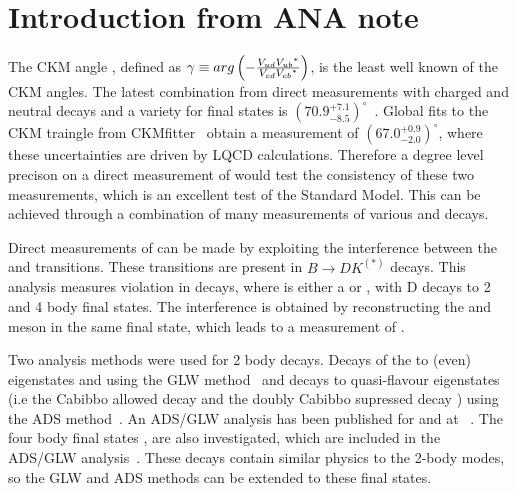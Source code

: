 \section{Introduction from ANA note}
\label{sec:Introduction}

The CKM angle \Pgamma, defined as $\gamma \equiv arg\left(-\frac{{V_{{u}{d}}}{{V_{{u}{b}}}}^*}{{V_{{c}{d}}}{{V_{{c}{b}}}}^*}\right)$, is the least well known of the CKM angles. The latest \lhcb combination from direct measurements with charged and neutral \B decays and a variety for \D final states is $\left(70.9^{+7.1}_{-8.5}\right)^{\circ}$~\cite{LHCB-PAPER-2016-032-001}. Global fits to the CKM traingle from CKMfitter~\cite{CKMfitter2015} obtain a \Pgamma measurement of $(67.0^{+0.9}_{-2.0})^{\circ}$, where these uncertainties are driven by LQCD calculations. Therefore a degree level precison on a direct measurement of \Pgamma would test the consistency of these two measurements, which is an excellent test of the Standard Model. This can be achieved through a combination of many measurements of various \B and \D decays.

Direct measurements of \Pgamma can be made by exploiting the interference between the \decay{\bquark}{\cquark\uquarkbar\squark} and \decay{\bquark}{\uquark\cquarkbar\squark} transitions. These transitions are present in $B \to DK^{(*)}$ decays. This analysis measures \CP violation in \decay{\Bpm}{\D\Kstarpm} decays, where \D is either a \Dz or \Dzb, with D decays to 2 and 4 body final states. The interference is obtained by reconstructing the \Dz and \Dzb meson in the same final state, which leads to a measurement of \Pgamma.

Two analysis methods were used for 2 body \D decays. Decays of the \D to \CP (even) eigenstates \Kp\Km and \pip\pim using the GLW method~\cite{GL,GW} and decays to quasi-flavour eigenstates \Kpm\pimp (i.e the Cabibbo allowed decay \decay{\Dz}{\Km\pip} and the doubly Cabibbo supressed decay \decay{\Dz}{\pim\Kp}) using the ADS method~\cite{ADS,ADS-2001}. An ADS/GLW analysis has been published for  and \decay{\Bz}{\D\Kstarz} at \lhcb~\cite{LHCb-PAPER-2016-003,LHCb-PAPER-2014-028}. The four body final states \decay{\Dz}{\Km\pip\pim\pip}, \decay{\Dz}{\pip\pim\pip\pim} \decay{\Dz}{\Kp\pim\pip\pim} are also investigated, which are included in the  ADS/GLW analysis~\cite{LHCb-PAPER-2016-003}. These \Dz decays contain similar physics to the 2-body modes, so the GLW and ADS methods can be extended to these final states.


